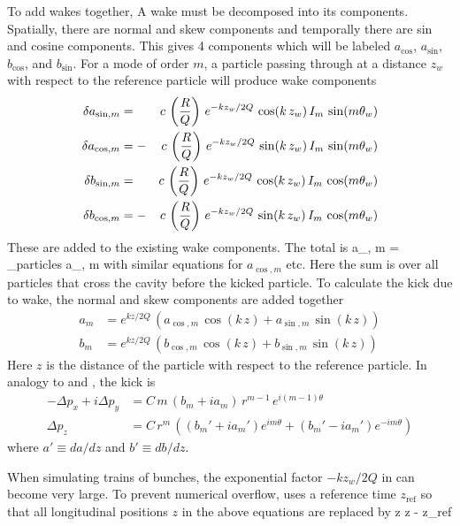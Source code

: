 To add wakes together, A wake must be decomposed into its
components.  Spatially, there are normal and skew components and
temporally there are sin and cosine components. This gives 4
components which will be labeled $a_{\cos}$, $a_{\sin}$, $b_{\cos}$,
and $b_{\sin}$. For a mode of order $m$, a particle passing through at
a distance $z_w$ with respect to the reference particle will produce
wake components
\begin{alignat}{2}
  \delta a_{\sin, m} &=  &c \, \left( \frac{R}{Q} \right) \,
    e^{-k z_w/ 2 Q} \, \cos (k \, z_w) \, I_m \, \sin(m \theta_w) 
    \nonumber \\
  \delta a_{\cos, m} &= -&c \, \left( \frac{R}{Q} \right) \,
    e^{-k z_w/ 2 Q} \, \sin (k \, z_w) \, I_m \, \sin(m \theta_w) 
    \label{ac2rq} 
    \\
  \delta b_{\sin, m} &=  &c \, \left( \frac{R}{Q} \right) \,
    e^{-k z_w/ 2 Q} \, \cos (k \, z_w) \, I_m \, \cos(m \theta_w) 
    \nonumber \\
  \delta b_{\cos, m} &= -&c \, \left( \frac{R}{Q} \right) \,
    e^{-k z_w/ 2 Q} \, \sin (k \, z_w) \, I_m \, \cos(m \theta_w) 
    \nonumber
\end{alignat}
These are added to the existing wake components. The total is
\Begineq
  a_{\sin, m} = \sum_{\mbox{particles}} \delta a_{\sin, m}
\Endeq
with similar equations for $a_{\cos, m}$ etc. Here the sum is over all particles
that cross the cavity before the kicked particle. To calculate the kick
due to wake, the normal and skew components are added together
\begin{align}
  a_m &= e^{k z/ 2 Q} \, \left( 
    a_{\cos, m} \, \cos (k \, z) + a_{\sin, m} \, \sin (k \, z) \right) 
    \label{akz2q} \\
  b_m &= e^{k z/ 2 Q} \, \left(
    b_{\cos, m} \, \cos (k \, z) + b_{\sin, m} \, \sin (k \, z) \right) \nonumber 
\end{align}
Here $z$ is the distance of the particle with respect to the
reference particle. In analogy to  and , the kick
is
\begin{align}
  -\Delta p_x + i\Delta p_y &= C \, 
    m \, (b_m + i a_m) \, r^{m-1} \, e^{i (m-1) \theta} 
    \label{ppcmbar} \\
  \Delta p_z &= C \, r^m \, \left( 
    (b_m' + i a_m') e^{i m\theta} + (b_m' - i a_m') e^{-i m\theta} \right)
\end{align}
where $a' \equiv da/dz$ and $b' \equiv db/dz$.

When simulating trains of bunches, the exponential factor $-k z_w / 2
Q$ in  can become very large. To prevent numerical overflow,
\bmad uses a reference time $z_{\mbox{ref}}$ so that all longitudinal
positions $z$ in the above equations are replaced by
\Begineq
  z \longrightarrow z - z_{\mbox{ref}}
\Endeq

